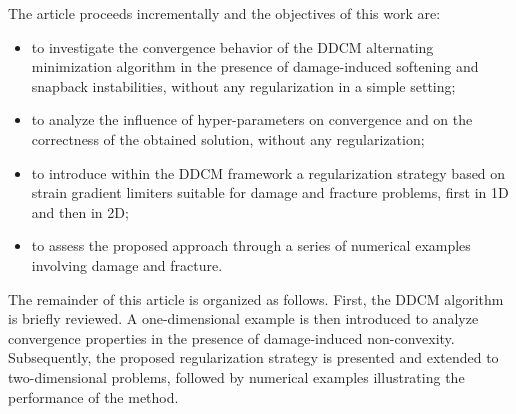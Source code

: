 \documentclass[10pt,review]{cas-sc}
\begin{document}
The article proceeds incrementally and the objectives of this work are:
\begin{itemize}
	\item to investigate the convergence behavior of the DDCM alternating minimization algorithm in the presence of damage-induced softening and snapback instabilities, without any regularization in a simple setting;
	\item to analyze the influence of hyper-parameters on convergence and on the correctness of the obtained solution, without any regularization;
	\item to introduce within the DDCM framework a regularization strategy based on strain gradient limiters suitable for damage and fracture problems, first in 1D and then in 2D;
	\item to assess the proposed approach through a series of numerical examples involving damage and fracture.
\end{itemize}

The remainder of this article is organized as follows. First, the DDCM algorithm is briefly reviewed. A one-dimensional example is then introduced to analyze convergence properties in the presence of damage-induced non-convexity. Subsequently, the proposed regularization strategy is presented and extended to two-dimensional problems, followed by numerical examples illustrating the performance of the method.
\end{document}

